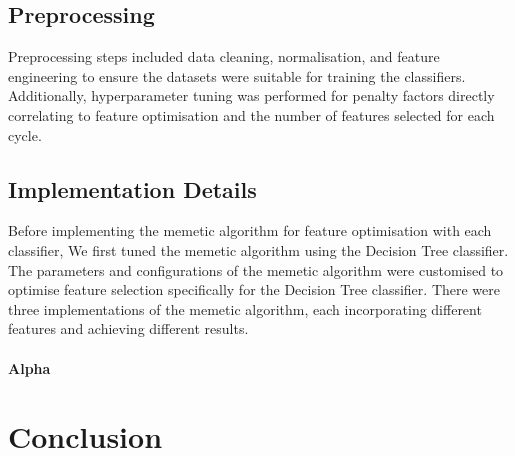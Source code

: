 \documentclass[conference]{IEEEtran}
\begin{document}
\subsection{Preprocessing}

Preprocessing steps included data cleaning, normalisation, and feature engineering to ensure the datasets were suitable for training the classifiers. Additionally, hyperparameter tuning was performed for penalty factors directly correlating to feature optimisation and the number of features selected for each cycle.

\subsection{Implementation Details}

Before implementing the memetic algorithm for feature optimisation with each classifier, We first tuned the memetic algorithm using the Decision Tree classifier. The parameters and configurations of the memetic algorithm were customised to optimise feature selection specifically for the Decision Tree classifier. There were three implementations of the memetic algorithm, each incorporating different features and achieving different results.


\paragraph{Alpha}

\section{Conclusion}

%
%
\end{document}
